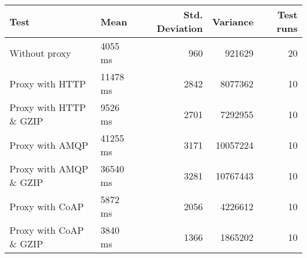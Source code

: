 \begin{tabular}{llrrr}
\hline
 Test                   & Mean     &   Std. Deviation &   Variance &   Test runs \\
\hline
 Without proxy          & 4055 ms  &              960 &     921629 &          20 \\
 Proxy with HTTP        & 11478 ms &             2842 &    8077362 &          10 \\
 Proxy with HTTP \& GZIP & 9526 ms  &             2701 &    7292955 &          10 \\
 Proxy with AMQP        & 41255 ms &             3171 &   10057224 &          10 \\
 Proxy with AMQP \& GZIP & 36540 ms &             3281 &   10767443 &          10 \\
 Proxy with CoAP        & 5872 ms  &             2056 &    4226612 &          10 \\
 Proxy with CoAP \& GZIP & 3840 ms  &             1366 &    1865202 &          10 \\
\hline
\end{tabular}